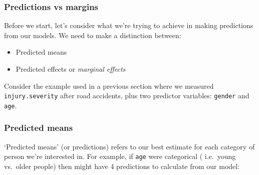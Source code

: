 \documentclass[]{article}
\providecommand{\tightlist}{%
  \setlength{\itemsep}{0pt}\setlength{\parskip}{0pt}}
\begin{document}
\hypertarget{predictions-vs-margins}{%
\subsubsection*{Predictions vs margins}\label{predictions-vs-margins}}

Before we start, let's consider what we're trying to achieve in making
predictions from our models. We need to make a distinction between:

\begin{itemize}
\tightlist
\item
  Predicted means
\item
  Predicted effects or \emph{marginal effects}
\end{itemize}

Consider the example used in a previous section where we measured
\texttt{injury.severity} after road accidents, plus two predictor variables: \texttt{gender}
and \texttt{age}.

\hypertarget{predicted-means}{%
\subsubsection*{Predicted means}\label{predicted-means}}

`Predicted means' (or predictions) refers to our best estimate for each category
of person we're interested in. For example, if \texttt{age} were categorical (
i.e.~young vs.~older people) then might have 4 predictions to calculate from our
model:
\end{document}
